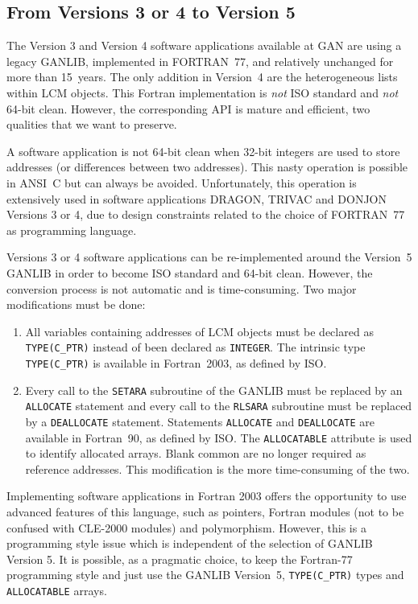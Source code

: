 \subsection {From Versions 3 or 4 to Version 5}

The Version 3 and Version 4 software applications available at GAN are using a legacy GANLIB, implemented in FORTRAN~77,
and relatively unchanged for more than 15~years.\cite{lcm1994} The only addition in Version~4 are the heterogeneous lists within LCM
objects. This Fortran implementation is {\sl not} ISO standard and {\sl not} 64-bit clean. However, the corresponding API
is mature and efficient, two qualities that we want to preserve.

\vskip 0.08cm

A software application is not 64-bit clean when 32-bit integers are used to store addresses (or differences between
two addresses). This nasty operation is possible in ANSI~C but can always be avoided. Unfortunately, this operation
is extensively used in software applications DRAGON, TRIVAC and DONJON Versions 3 or 4, due to design constraints
related to the choice of FORTRAN~77 as programming language.

\vskip 0.08cm

Versions 3 or 4 software applications can be re-implemented around the Version~5 GANLIB in order to become ISO standard and 64-bit clean.
However, the conversion process is not automatic and is time-consuming. Two major modifications must be done:
\begin{enumerate}
\item All variables containing addresses of LCM objects must be declared as {\tt TYPE(C\_PTR)} instead of been
declared as {\tt INTEGER}. The intrinsic type {\tt TYPE(C\_PTR)} is available in Fortran~2003, as defined by ISO.
\item Every call to the {\tt SETARA} subroutine of the GANLIB must be replaced by an {\tt ALLOCATE} statement and every call to the {\tt RLSARA}
subroutine must be replaced by a {\tt DEALLOCATE} statement. Statements {\tt ALLOCATE}  and {\tt DEALLOCATE} are
available in Fortran~90, as defined by ISO. The {\tt ALLOCATABLE} attribute is used to identify allocated arrays. Blank common
are no longer required as reference addresses. This modification
is the more time-consuming of the two.
\end{enumerate}

\vskip 0.08cm

Implementing software applications in Fortran 2003 offers the opportunity to use advanced features of this language, such
as pointers, Fortran modules (not to be confused with CLE-2000 modules) and polymorphism. However, this is a programming
style issue which is independent of the selection of GANLIB Version 5. It is possible, as a pragmatic choice, to keep the Fortran-77 programming style
and just use the GANLIB Version~5, {\tt TYPE(C\_PTR)} types and {\tt ALLOCATABLE} arrays.

